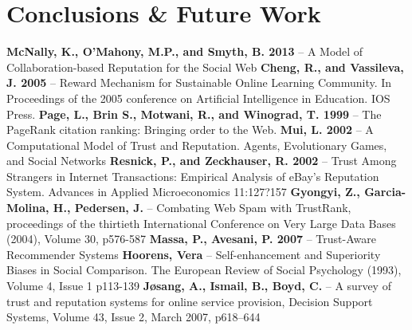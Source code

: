 \documentclass[]{final_report}
\begin{document}
\chapter{Conclusions \& Future Work}

\newpage
\raggedright
\textbf{McNally, K., O'Mahony, M.P., and Smyth, B. 2013} -- A Model of Collaboration-based Reputation for the Social Web
\linebreak
\linebreak
\textbf{Cheng, R., and Vassileva, J. 2005} -- Reward Mechanism for Sustainable Online Learning Community. In Proceedings of the 2005 conference on Artificial Intelligence in Education. IOS Press.
\linebreak
\linebreak
\textbf{Page, L., Brin S., Motwani, R., and Winograd, T. 1999} -- The PageRank citation ranking: Bringing order to the Web.
\linebreak
\linebreak
\textbf{Mui, L. 2002} -- A Computational Model of Trust and Reputation. Agents, Evolutionary Games, and Social Networks
\linebreak
\linebreak
\textbf{Resnick, P., and Zeckhauser, R. 2002} -- Trust Among Strangers in Internet Transactions: Empirical Analysis of eBay's Reputation System. Advances in Applied Microeconomics 11:127?157
\linebreak
\linebreak
\textbf{Gyongyi, Z., Garcia-Molina, H., Pedersen, J.} -- Combating Web Spam with TrustRank, proceedings of the thirtieth International Conference on Very Large Data Bases (2004), Volume 30, p576-587
\linebreak
\linebreak
\textbf{Massa, P., Avesani, P. 2007} -- Trust-Aware Recommender Systems
\linebreak
\linebreak
\textbf{Hoorens, Vera} -- Self-enhancement and Superiority Biases in Social Comparison. The European Review of Social Psychology (1993), Volume 4, Issue 1 p113-139
\linebreak
\linebreak
\textbf{Jøsang, A., Ismail, B., Boyd, C.} -- A survey of trust and reputation systems for online service provision, Decision Support Systems, Volume 43, Issue 2, March 2007, p618–644



\label{endpage}
\end{document}
